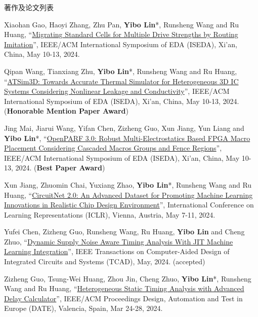 \begin{rSection}{著作及论文列表}
\begin{description}[font=\normalfont, rightmargin=2em]
{}
            

\item[{[C146]}]{
        Xiaohan Gao, Haoyi Zhang, Zhu Pan, \textbf{Yibo Lin}*, Runsheng Wang and Ru Huang, 
    ``\href{https://doi.org/10.1109/ISEDA62518.2024.10617650}{Migrating Standard Cells for Multiple Drive Strengths by Routing Imitation}'', 
    IEEE/ACM International Symposium of EDA (ISEDA), Xi'an, China, May 10-13, 2024.
    
}
            

\item[{[C145]}]{
        Qipan Wang, Tianxiang Zhu, \textbf{Yibo Lin}*, Runsheng Wang and Ru Huang, 
    ``\href{https://doi.org/10.1109/ISEDA62518.2024.10617604}{ATSim3D: Towards Accurate Thermal Simulator for Heterogeneous 3D IC Systems Considering Nonlinear Leakage and Conductivity}'', 
    IEEE/ACM International Symposium of EDA (ISEDA), Xi'an, China, May 10-13, 2024.
    (\textbf{Honorable Mention Paper Award})
}
            

\item[{[C144]}]{
        Jing Mai, Jiarui Wang, Yifan Chen, Zizheng Guo, Xun Jiang, Yun Liang and \textbf{Yibo Lin}*, 
    ``\href{https://doi.org/10.1109/ISEDA62518.2024.10617535}{OpenPARF 3.0: Robust Multi-Electrostatics Based FPGA Macro Placement Considering Cascaded Macros Groups and Fence Regions}'', 
    IEEE/ACM International Symposium of EDA (ISEDA), Xi'an, China, May 10-13, 2024.
    (\textbf{Best Paper Award})
}
            

\item[{[C143]}]{
        Xun Jiang, Zhuomin Chai, Yuxiang Zhao, \textbf{Yibo Lin}*, Runsheng Wang and Ru Huang, 
    ``\href{https://openreview.net/pdf?id=nMFSUjxMIl}{CircuitNet 2.0: An Advanced Dataset for Promoting Machine Learning Innovations in Realistic Chip Design Environment}'', 
    International Conference on Learning Representations (ICLR), Vienna, Austria, May 7-11, 2024.
    
}
            

\item[{[J142]}]{
        Yufei Chen, Zizheng Guo, Runsheng Wang, Ru Huang, \textbf{Yibo Lin} and Cheng Zhuo, 
    ``\href{https://doi.org/10.1109/TCAD.2023.3342603}{Dynamic Supply Noise Aware Timing Analysis With JIT Machine Learning Integration}'', 
    IEEE Transactions on Computer-Aided Design of Integrated Circuits and Systems (TCAD), May, 2024.
    (accepted)
}
            

\item[{[C141]}]{
        Zizheng Guo, Tsung-Wei Huang, Zhou Jin, Cheng Zhuo, \textbf{Yibo Lin}*, Runsheng Wang and Ru Huang, 
    ``\href{https://ieeexplore.ieee.org/document/10546507}{Heterogeneous Static Timing Analysis with Advanced Delay Calculator}'', 
    IEEE/ACM Proceedings Design, Automation and Test in Europe (DATE), Valencia, Spain, Mar 24-28, 2024.
    
}
\end{description}
\end{rSection}
